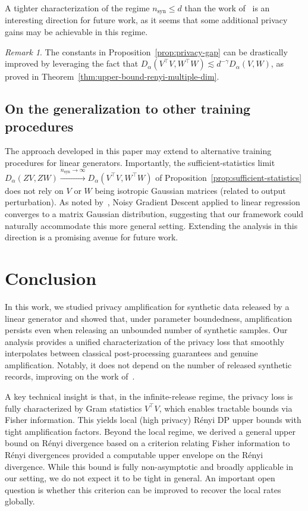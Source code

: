 \documentclass{article}
\theoremstyle{plain}
\theoremstyle{definition}
\theoremstyle{remark}
\newtheorem{remark}[theorem]{Remark}
\begin{document}
A tighter characterization of the regime $n_{\text{syn}} \leq d$ than the work of~\citet{pierquin2025} is an interesting direction for future work, as it seems that some additional privacy gains may be achievable in this regime.

\begin{remark}
    The constants in Proposition~\ref{prop:privacy-gap} can be drastically improved by leveraging the fact that $D_\alpha(V^\top V, W^\top W) \lesssim d^{-\gamma} D_\alpha(V,W)$, as proved in Theorem~\ref{thm:upper-bound-renyi-multiple-dim}.
\end{remark}
\subsection{On the generalization to other training procedures}

The approach developed in this paper may extend to alternative training procedures for linear generators. Importantly, the sufficient-statistics limit  $D_\alpha(ZV,ZW) \overset{n_{\text{syn}} \to \infty}{\longrightarrow} D_\alpha(V^\top V, W^\top W)$ of Proposition~\ref{prop:sufficient-statistics} does not rely on $V$ or $W$ being isotropic Gaussian matrices (related to output perturbation). As noted by~\citet{Brown2024}, Noisy Gradient Descent applied to linear regression converges to a matrix Gaussian distribution, suggesting that our framework could naturally accommodate this more general setting. Extending the analysis in this direction is a promising avenue for future work.

\section{Conclusion}

In this work, we studied privacy amplification for synthetic data released by a linear generator and showed that, under parameter boundedness, amplification persists even when releasing an unbounded number of synthetic samples. Our analysis provides a unified characterization of the privacy loss that smoothly interpolates between classical post-processing guarantees and genuine amplification. Notably, it does not depend on the number of released synthetic records, improving on the work of~\citet{pierquin2025}.

A key technical insight is that, in the infinite-release regime, the privacy loss is fully characterized by Gram statistics $V^\top V$, which enables tractable bounds via Fisher information. This yields local (high privacy) Rényi DP upper bounds with tight amplification factors. Beyond the local regime, we derived a general upper bound on Rényi divergence based on a criterion relating Fisher information to Rényi divergences provided a computable upper envelope on the Rényi divergence. While this bound is fully non-asymptotic and broadly applicable in our setting, we do not expect it to be tight in general. An important open question is whether this criterion can be improved to recover the local rates globally.
\end{document}
